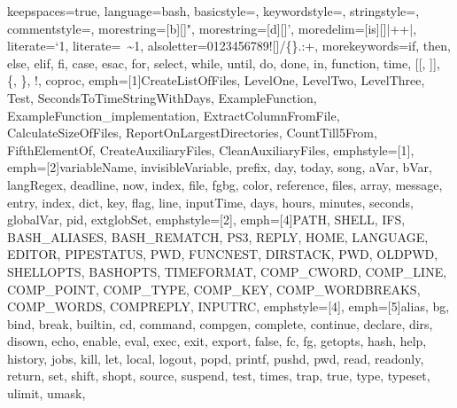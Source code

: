 {%
keepspaces=true,                    %
language=bash,
basicstyle=\ttfamily\scriptsize\color{basic-color},
keywordstyle=\color{keywords-color},
stringstyle=\color{strings-color},
commentstyle=\color{comment-color},
morestring=[b][\color{strings-color}]{"},
morestring=[d][\color{strings-color}]{'},
moredelim=[is][\color{basic-color}]{|+}{+|}, %
literate={`}{\textasciigrave}1, %
literate={~}{{\textasciitilde}}1,
alsoletter=0123456789![]/\{\}.:+, %
morekeywords={if, then, else, elif, fi, case, esac, for, select, while, until, do, done, in, function, time, [[, ]], \{, \}, !, coproc}, %
emph=[1]{CreateListOfFiles, LevelOne, LevelTwo, LevelThree, Test, SecondsToTimeStringWithDays, ExampleFunction,
         ExampleFunction_implementation, ExtractColumnFromFile, CalculateSizeOfFiles, ReportOnLargestDirectories,
         CountTill5From, FifthElementOf, CreateAuxiliaryFiles, CleanAuxiliaryFiles},
emphstyle=[1]{\color{functions-color}}, %
emph=[2]{variableName, invisibleVariable, prefix, day, today, song, aVar, bVar, langRegex, deadline, now,
         index, file, fgbg, color, reference, files, array, message, entry, index, dict, key, flag, line, inputTime,
         days, hours, minutes, seconds, globalVar, pid, extglobSet},
emphstyle=[2]{\color{variables-color}}, %
emph=[4]{PATH, SHELL, IFS, BASH_ALIASES, BASH_REMATCH, PS3, REPLY, HOME, LANGUAGE, EDITOR, PIPESTATUS, PWD, FUNCNEST,
         DIRSTACK, PWD, OLDPWD, SHELLOPTS, BASHOPTS, TIMEFORMAT, COMP_CWORD, COMP_LINE, COMP_POINT, COMP_TYPE, COMP_KEY,
         COMP_WORDBREAKS, COMP_WORDS, COMPREPLY, INPUTRC},
emphstyle=[4]{\color{environment-color}}, %
emph=[5]{alias, bg, bind, break, builtin, cd, command, compgen, complete, continue, declare, dirs, disown, echo, enable, eval,
         exec, exit, export, false, fc, fg, getopts, hash, help, history, jobs, kill, let, local, logout, popd, printf, pushd, pwd,
         read, readonly, return, set, shift, shopt, source, suspend, test, times, trap, true, type, typeset, ulimit, umask,
}}
